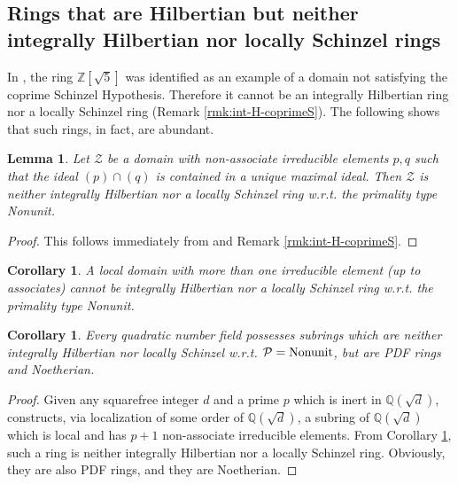 \documentclass[11pt,a4paper,reqno]{amsart}
\def\Z{\mathbb{Z}}
\newtheorem{lem}[thm]{Lemma}
\newtheorem{cor}[thm]{Corollary}
\theoremstyle{definition}
\begin{document}
\subsection{Rings that are Hilbertian but neither integrally Hilbertian nor locally Schinzel rings} \label{ssec:counter-examples}

In \cite[Proposition 2.10]{BDKN22}, the ring $\Z[\sqrt{5}]$ was identified as an example of a domain not satisfying the coprime Schinzel Hypothesis. Therefore it cannot be an integrally Hilbertian ring nor a locally Schinzel ring (Remark \ref{rmk:int-H-coprimeS}). The following shows that such rings, in fact, are abundant. 

\begin{lem}
Let $\mathcal{Z}$ be a domain with non-associate irreducible elements $p,q$ such that the ideal $(p)\cap (q)$ is contained in a unique maximal ideal. Then $\mathcal{Z}$ is neither integrally Hilbertian nor a locally Schinzel ring \hbox{w.r.t.} the primality type {\rm Nonunit}.
\end{lem}
\begin{proof}
This follows immediately from \cite[Proposition 2.8]{BDKN22} and Remark \ref{rmk:int-H-coprimeS}.
\end{proof}

\begin{cor} 
\label{cor:local}
A local domain with more than one irreducible element (up to associates) cannot be integrally Hilbertian nor a locally Schinzel ring \hbox{w.r.t.} the primality type {\rm Nonunit}.
\end{cor}

\begin{cor}
\label{cor:many_nonintH}
Every quadratic number field possesses subrings which are neither integrally Hilbertian nor  locally Schinzel \hbox{w.r.t.}  ${\mathcal P} = {\rm Nonunit}$, but are PDF rings and Noetherian.
\end{cor}

\begin{proof}
Given any squarefree integer $d$ and a prime $p$ which is inert in $\mathbb{Q}(\sqrt{d})$, \cite[Theorem 3.1]{CS12} constructs, via localization of some order of $\mathbb{Q}(\sqrt{d})$, a subring of $\mathbb{Q}(\sqrt{d})$ which is local and has $p+1$ non-associate irreducible elements. From Corollary \ref{cor:local}, such a ring is neither integrally Hilbertian nor a locally Schinzel ring. %
Obviously, they are also PDF rings, and they are Noetherian.
\end{proof}
\end{document}
